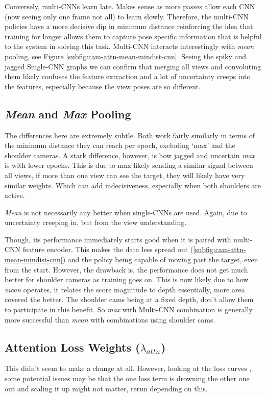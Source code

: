Conversely, multi-CNNs learn late. Makes sense as more passes allow each CNN (now seeing only one frame not all) to learn slowly. Therefore, the multi-CNN policies have a more decisive dip in minimum distance reinforcing the idea that training for longer allows them to capture pose specific information that is helpful to the system in solving this task. Multi-CNN interacts interestingly with \emph{mean} pooling, see Figure \ref{subfig:cam-attn-mean-mindist-cnn}. Seeing the spiky and jagged Single-CNN graphs we can confirm that merging all views and convoluting them likely confuses the feature extraction and a lot of uncertainty creeps into the features, especially because the view poses are so different.


\subsection{\emph{Mean} and \emph{Max} Pooling}
The differences here are extremely subtle. Both work fairly similarly in terms of the minimum distance they can reach per epoch, excluding `max' and the shoulder cameras. A stark difference, however, is how jagged and uncertain \emph{max} is with lower epochs. This is due to max likely sending a similar signal between all views, if more than one view can see the target, they will likely have very similar weights. Which can add indecisiveness, especially when both shoulders are active.

\emph{Mean} is not necessarily any better when single-CNNs are used. Again, due to uncertainty creeping in, but from the view understanding.

Though, its performance immediately starts good when it is paired with multi-CNN feature encoder. This makes the data less spread out (\ref{subfig:cam-attn-mean-mindist-cnn}) and the policy being capable of moving past the target, even from the start. However, the drawback is, the performance does not get much better for shoulder cameras as training goes on. This is now likely due to how \emph{mean} operates, it relates the score magnitude to depth essentially, more area covered the better. The shoulder cams being at a fixed depth, don't allow them to participate in this benefit. So \emph{max} with Multi-CNN combination is generally more successful than \emph{mean} with combinations using shoulder cams.

\subsection{Attention Loss Weights ($\lambda_{attn}$)}
This didn't seem to make a change at all. However, looking at the loss curves , some potential issues may be that the one loss term is drowning the other one out and scaling it up might not matter, rerun depending on this.

